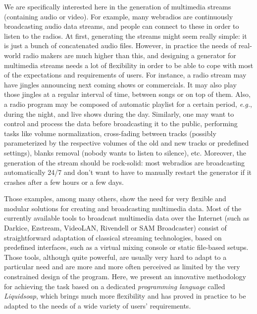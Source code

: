 \documentclass{llncs}
\newcommand{\eg}{\emph{e.g.},}
\newcommand{\TODO}[1]{\marginpar{\tiny #1}}
\begin{document}
We are specifically interested here in the generation of multimedia streams
(containing audio or video). For example, many webradios are continuously
broadcasting audio data streams, and people can connect to these in order to
listen to the radios. At first, generating the streams might seem really simple:
it is just a bunch of concatenated audio files. However, in practice the needs
of real-world radio makers are much higher than this, and designing a generator
for multimedia streams needs a lot of flexibility in order to be able to cope
with most of the expectations and requirements of users. For instance, a radio
stream may have jingles announcing next coming shows or commercials. It may also
play those jingles at a regular interval of time, between songs or on top of
them. Also, a radio program may be composed of automatic playlist for a certain
period, \eg{} during the night, and live shows during the day. Similarly, one
may want to control and process the data before broadcasting it to the public,
performing tasks like volume normalization, cross-fading between tracks
(possibly parameterized by the respective volumes of the old and new tracks or
predefined settings), blanks removal (nobody wants to listen to silence),
etc. Moreover, the generation of the stream should be rock-solid: most webradios
are broadcasting automatically 24/7 and don't want to have to manually restart
the generator if it crashes after a few hours or a few days.

Those examples, among many others, show the need for very flexible and modular
solutions for creating and broadcasting multimedia data. Most of the currently
available tools to broadcast multimedia data over the Internet (such as Darkice,
Ezstream, VideoLAN, Rivendell or SAM Broadcaster) consist of straightforward
adaptation of classical streaming technologies, based on
predefined interfaces, such as a virtual mixing console or static file-based
setups. Those tools, although quite powerful, are usually very hard to adapt to
a particular need and are more and more often perceived as limited by the very
\TODO{DB "new" c'est abusé}
\TODO{RB c ok avec innovative ?}
constrained design of the program. Here, we present an innovative methodology for
achieving the task based on a dedicated \emph{programming language} called
\emph{Liquidsoap}, which brings much more flexibility and has proved in practice
to be adapted to the needs of a wide variety of users' requirements.
\end{document}

